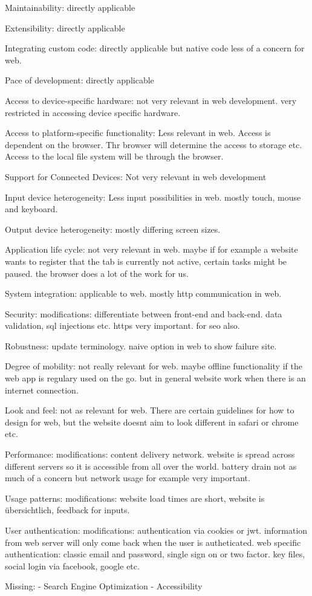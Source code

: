 Maintainability: 
directly applicable

Extensibility:
directly applicable

Integrating custom code: 
directly applicable but native code less of a concern for web.

Pace of development: 
directly applicable

Access to device-specific hardware:
not very relevant in web development. very restricted in accessing device specific hardware.

Access to platform-specific functionality: 
Less relevant in web. Access is dependent on the browser. Thr browser will determine the access to storage etc.
Access to the local file system will be through the browser.

Support for Connected Devices: 
Not very relevant in web development

Input device heterogeneity: 
Less input possibilities in web. mostly touch, mouse and keyboard.

Output device heterogeneity:
mostly differing screen sizes.

Application life cycle:
not very relevant in web. 
maybe if for example a website wants to register that the tab is currently not active, certain tasks might be paused. 
the browser does a lot of the work for us.

System integration: 
applicable to web. mostly http communication in web.

Security:
modifications:
differentiate between front-end and back-end. 
data validation, sql injections etc.
https very important. for seo also.

Robustness:
update terminology. 
naive option in web to show failure site.

Degree of mobility:
not really relevant for web.
maybe offline functionality if the web app is regulary used on the go.
but in general website work when there is an internet connection.

Look and feel:
not as relevant for web. There are certain guidelines for how to design for web, but the website doesnt aim to look different in safari or chrome etc.

Performance: 
modifications: 
content delivery network. website is spread across different servers so it is accessible from all over the world. 
battery drain not as much of a concern but network usage for example very important. 

Usage patterns:
modifications: 
website load times are short, website is übersichtlich, feedback for inputs. 

User authentication: 
modifications:
authentication via cookies or jwt. information from web server will only come back when the user is autheticated. 
web specific authentication: classic email and password, single sign on or two factor. key files, social login via facebook, google etc.


Missing:
- Search Engine Optimization
- Accessibility




 


